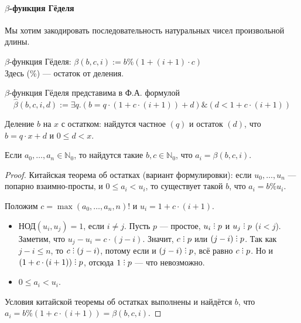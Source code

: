 \paragraph{$\beta$-функция Гёделя}
Мы хотим закодировать последовательность натуральных чисел произвольной  длины.
\begin{definition}$\beta$-функция Гёделя: $\mathcal{\beta}(b,c,i) := b \% (1 + (i+1) \cdot c)$\\
Здесь (\%) --- остаток от деления.
\end{definition}

\begin{theorem}$\beta$-функция Гёделя представима в Ф.А. формулой
$$\hat{\beta}(b,c,i,d) := \exists q.(b = q \cdot (1 + c \cdot (i+1)) + d) \& (d < 1 + c \cdot (i+1))$$
\end{theorem}
Деление $b$ на $x$ с остатком: найдутся частное $(q)$ и остаток $(d)$, что
$b = q\cdot x + d$ и $0 \le d < x$.

\begin{theorem}
    Если $a_0, \dots, a_n \in \mathbb{N}_0$, то найдутся такие $b,c \in \mathbb{N}_0$, что $a_i = \beta(b,c,i)$.
\end{theorem}

\begin{proof}
    Китайская теорема об остатках (вариант формулировки): если $u_0, \dots, u_n$ --- попарно взаимно-просты, и $0 \le a_i < u_i$, то существует такой $b$, что $a_i = b \% u_i$.

Положим $c = \max(a_0,\dots,a_n,n)!$ и $u_i = 1+c\cdot(i+1)$.

\begin{itemize}
\item $\text{НОД}(u_i,u_j) = 1$, если $i \ne j$.
Пусть $p$ --- простое, $u_i\divisible p$ и $u_j\divisible p$ ($i < j$).
Заметим, что $u_j-u_i = c \cdot (j-i)$. Значит, $c\divisible p$ или $(j-i)\divisible p$.
Так как $j-i \le n$, то $c \divisible (j-i)$, потому если и $(j-i)\divisible p$, всё равно $c \divisible p$.
Но и $(1+c\cdot(i+1))\divisible p$, отсюда $1 \divisible p$ --- что невозможно.
\item $0 \le a_i < u_i$.
\end{itemize}
Условия китайской теоремы об остатках выполнены и найдётся $b$, что
$a_i = b \% (1 + c\cdot(i+1)) = \beta(b,c,i)$.
\end{proof}

